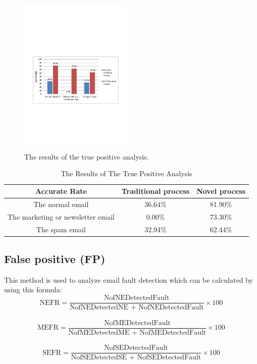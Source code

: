 \documentclass[conference]{IEEEtran}
\begin{document}
\begin{figure}
\centering
\includegraphics[width=0.48\textwidth]{8.pdf}
\caption{The results of the true positive analysis.}
\label{fig:resultTP}
\end{figure}

\begin{table}[!t]
\renewcommand{\arraystretch}{1.2}
\caption{The Results of The True Positive Analysis}
\label{table_resultsTP}
\centering
\begin{tabular}{c|c|c}
\hline
\bfseries Accurate Rate & \bfseries Traditional process & \bfseries Novel process\\
\hline
The normal email & 36.64\% & 81.90\%\\
\hline
The marketing or newsletter email & 0.00\% & 73.30\%\\
\hline
The spam email & 32.94\% & 62.44\%\\
\hline
\end{tabular}
\end{table}

\subsection{False positive (FP)}
This method is used to analyze email fault detection which can be calculated by using this formula:\\
$$ \text{NEFR} =  \frac{\text{NofNEDetectedFault}}{\text{NofNEDetectedNE + NofNEDetectedFault}} \times 100 $$\\
$$ \text{MEFR} =  \frac{\text{NofMEDetectedFault}}{\text{NofMEDetectedME + NofMEDetectedFault}} \times 100 $$\\
$$ \text{SEFR} =  \frac{\text{NofSEDetectedFault}}{\text{NofSEDetectedSE + NofSEDetectedFault}} \times 100 $$\\
\end{document}

